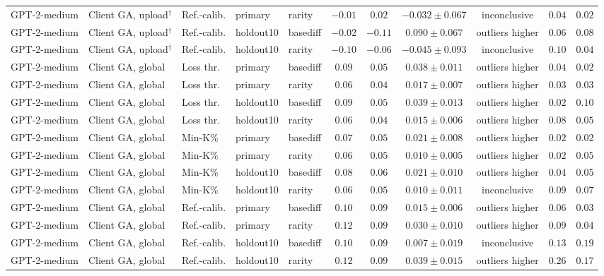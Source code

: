 {\begin{longtable}{@{\extracolsep{\fill}}lllllcccccc@{}}
GPT-2-medium & Client GA, upload$^{\dagger}$ & Ref.-calib. & primary & rarity & $-0.01$ & $0.02$ & $-0.032 \pm 0.067$ & inconclusive & $0.04$ & $0.02$ \\
GPT-2-medium & Client GA, upload$^{\dagger}$ & Ref.-calib. & holdout10 & basediff & $-0.02$ & $-0.11$ & $0.090 \pm 0.067$ & outliers higher & $0.06$ & $0.08$ \\
GPT-2-medium & Client GA, upload$^{\dagger}$ & Ref.-calib. & holdout10 & rarity & $-0.10$ & $-0.06$ & $-0.045 \pm 0.093$ & inconclusive & $0.10$ & $0.04$ \\
GPT-2-medium & Client GA, global & Loss thr. & primary & basediff & $0.09$ & $0.05$ & $0.038 \pm 0.011$ & outliers higher & $0.04$ & $0.02$ \\
GPT-2-medium & Client GA, global & Loss thr. & primary & rarity & $0.06$ & $0.04$ & $0.017 \pm 0.007$ & outliers higher & $0.03$ & $0.03$ \\
GPT-2-medium & Client GA, global & Loss thr. & holdout10 & basediff & $0.09$ & $0.05$ & $0.039 \pm 0.013$ & outliers higher & $0.02$ & $0.10$ \\
GPT-2-medium & Client GA, global & Loss thr. & holdout10 & rarity & $0.06$ & $0.04$ & $0.015 \pm 0.006$ & outliers higher & $0.08$ & $0.05$ \\
GPT-2-medium & Client GA, global & Min-K\% & primary & basediff & $0.07$ & $0.05$ & $0.021 \pm 0.008$ & outliers higher & $0.02$ & $0.02$ \\
GPT-2-medium & Client GA, global & Min-K\% & primary & rarity & $0.06$ & $0.05$ & $0.010 \pm 0.005$ & outliers higher & $0.02$ & $0.05$ \\
GPT-2-medium & Client GA, global & Min-K\% & holdout10 & basediff & $0.08$ & $0.06$ & $0.021 \pm 0.010$ & outliers higher & $0.04$ & $0.05$ \\
GPT-2-medium & Client GA, global & Min-K\% & holdout10 & rarity & $0.06$ & $0.05$ & $0.010 \pm 0.011$ & inconclusive & $0.09$ & $0.07$ \\
GPT-2-medium & Client GA, global & Ref.-calib. & primary & basediff & $0.10$ & $0.09$ & $0.015 \pm 0.006$ & outliers higher & $0.06$ & $0.03$ \\
GPT-2-medium & Client GA, global & Ref.-calib. & primary & rarity & $0.12$ & $0.09$ & $0.030 \pm 0.010$ & outliers higher & $0.09$ & $0.04$ \\
GPT-2-medium & Client GA, global & Ref.-calib. & holdout10 & basediff & $0.10$ & $0.09$ & $0.007 \pm 0.019$ & inconclusive & $0.13$ & $0.19$ \\
GPT-2-medium & Client GA, global & Ref.-calib. & holdout10 & rarity & $0.12$ & $0.09$ & $0.039 \pm 0.015$ & outliers higher & $0.26$ & $0.17$ \\

\end{longtable}}
